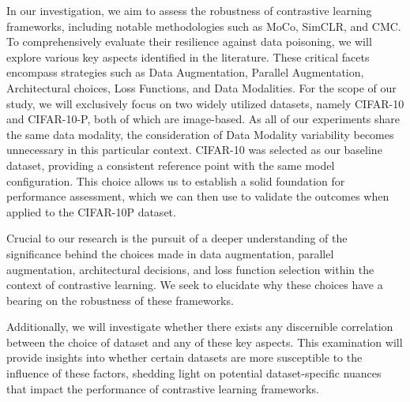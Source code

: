 In our investigation, we aim to assess the robustness of contrastive learning frameworks, including notable methodologies such as MoCo, SimCLR, and CMC. To comprehensively evaluate their resilience against data poisoning, we will explore various key aspects identified in the literature. These critical facets encompass strategies such as Data Augmentation, Parallel Augmentation, Architectural choices, Loss Functions, and Data Modalities. For the scope of our study, we will exclusively focus on two widely utilized datasets, namely CIFAR-10 and CIFAR-10-P, both of which are image-based. As all of our experiments share the same data modality, the consideration of Data Modality variability becomes unnecessary in this particular context. CIFAR-10 was selected as our baseline dataset, providing a consistent reference point with the same model configuration. This choice allows us to establish a solid foundation for performance assessment, which we can then use to validate the outcomes when applied to the CIFAR-10P dataset.

Crucial to our research is the pursuit of a deeper understanding of the significance behind the choices made in data augmentation, parallel augmentation, architectural decisions, and loss function selection within the context of contrastive learning. We seek to elucidate why these choices have a bearing on the robustness of these frameworks.

Additionally, we will investigate whether there exists any discernible correlation between the choice of dataset and any of these key aspects. This examination will provide insights into whether certain datasets are more susceptible to the influence of these factors, shedding light on potential dataset-specific nuances that impact the performance of contrastive learning frameworks.
